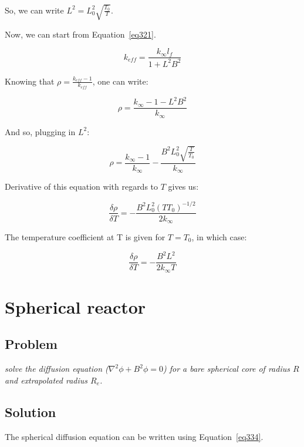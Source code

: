 So, we can write $L^2 = L_0^2\sqrt{\frac{T_0}{T}}$.

Now, we can start from Equation~\ref{eq321}.


\begin{equation}\label{eq321}
k_{eff} = \frac{k_{\infty} l_f}{1 + L^2B^2}
\end{equation}

Knowing that $\rho = \frac{k_{eff} - 1}{k_{eff}}$, one can write:


\begin{equation}\label{eq322}
\rho = \frac{k_{\infty} - 1 - L^2B^2}{k_{\infty}}
\end{equation}

And so, plugging in $L^2$:


\begin{equation}\label{eq323}
\rho = \frac{k_{\infty} - 1}{k_{\infty}} - \frac{B^2L_0^2\sqrt{\frac{T}{T_0}}}{k_{\infty}}
\end{equation}

Derivative of this equation with regards to $T$ gives us:


\begin{equation}\label{eq324}
\frac{\delta \rho}{\delta T} = - \frac{B^2L_0^2(T T_0)^{-1/2}}{2k_{\infty}}
\end{equation}

The temperature coefficient at T is given for $T=T_0$, in which case:


\begin{equation}\label{eq325}
\frac{\delta \rho}{\delta T} = - \frac{B^2L^2}{2k_{\infty}T}
\end{equation}

\section{Spherical reactor}
\label{prob36}

\subsection{Problem}
\textit{solve the diffusion equation ($\nabla^2 \phi + B^2\phi = 0$) for a bare spherical core of radius $R$ and extrapolated radius $R_e$.}

\subsection{Solution}

The spherical diffusion equation can be written using Equation~\ref{eq334}.


